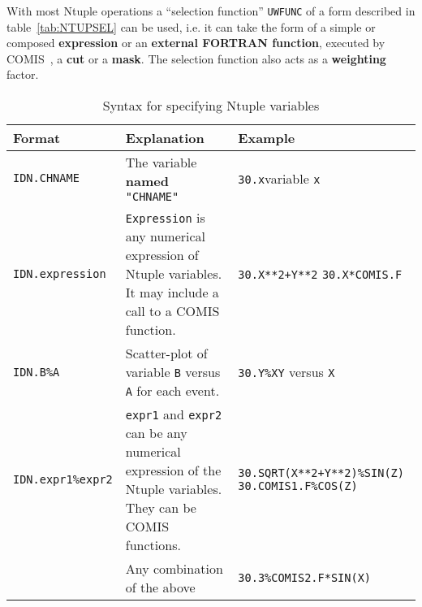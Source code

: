 With most Ntuple operations a ``selection function'' \texttt{UWFUNC} of a form
described in table~\ref{tab:NTUPSEL} can be used, i.e. it can take the form of
a simple or composed {\bf expression} or an {\bf external FORTRAN function}, 
executed by COMIS~\cite{bib-COMIS}, a {\bf cut} or a {\bf mask}. The selection 
function also acts as a {\bf weighting} factor.

\newcommand{\PBS}[1]{\let\temp=\\#1\let\\=\temp}
\begin{table}
\begin{center}
\begin{tabular}{|lp{}>{\PBS\raggedright}p{}|}
\hline
\rm\bf Format      & \rm\bf Explanation &\rm\bf Example                       \\
\hline
\texttt{IDN.CHNAME}                                                            &
The variable {\bf named} \texttt{"CHNAME"}                                     &
\texttt{30.x}\qquad     variable \texttt{x}                                   \\
\texttt{IDN.expression}                                                        &
\texttt{Expression} is any numerical expression of Ntuple variables.
It may include a call to a COMIS function.                                     &
\texttt{30.X**2+Y**2} \texttt{30.X*COMIS.F}                                   \\
\texttt{IDN.B\%A}                                                              &
Scatter-plot of variable \texttt{B} versus \texttt{A} for each event.          &
\texttt{30.Y\%X}\qquad \texttt{Y} versus \texttt{X}                           \\
\texttt{IDN.expr1\%expr2}                                                      &
\texttt{expr1} and \texttt{expr2} can be
any numerical expression of the Ntuple variables.
They can be COMIS functions.                                                   &
\texttt{30.SQRT(X**2+Y**2)\%SIN(Z)}
\texttt{30.COMIS1.F\%COS(Z)}                                                  \\
                                                                               &
Any combination of the above                                                   &
\texttt{30.3\%COMIS2.F*SIN(X)}                                                \\
\hline
\end{tabular}
\end{center}
\caption{Syntax for specifying Ntuple variables}
\label{tab:NTUPID}


\end{table}
